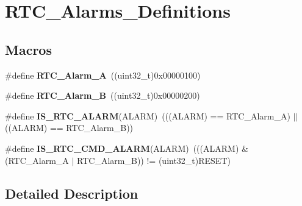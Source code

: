 \hypertarget{group___r_t_c___alarms___definitions}{\section{R\-T\-C\-\_\-\-Alarms\-\_\-\-Definitions}
\label{group___r_t_c___alarms___definitions}
}
\subsection*{Macros}
\begin{DoxyCompactItemize}
\item 
\hypertarget{group___r_t_c___alarms___definitions_ga8d6daed1177365822e9f4e443ec394c7}{\#define {\bfseries R\-T\-C\-\_\-\-Alarm\-\_\-\-A}~((uint32\-\_\-t)0x00000100)}\label{group___r_t_c___alarms___definitions_ga8d6daed1177365822e9f4e443ec394c7}

\item 
\hypertarget{group___r_t_c___alarms___definitions_gaf51f54c28f0052d97a8764741218d372}{\#define {\bfseries R\-T\-C\-\_\-\-Alarm\-\_\-\-B}~((uint32\-\_\-t)0x00000200)}\label{group___r_t_c___alarms___definitions_gaf51f54c28f0052d97a8764741218d372}

\item 
\hypertarget{group___r_t_c___alarms___definitions_gab101ad18b0bcde557eb8caac469d7725}{\#define {\bfseries I\-S\-\_\-\-R\-T\-C\-\_\-\-A\-L\-A\-R\-M}(A\-L\-A\-R\-M)~(((A\-L\-A\-R\-M) == R\-T\-C\-\_\-\-Alarm\-\_\-\-A) $|$$|$ ((A\-L\-A\-R\-M) == R\-T\-C\-\_\-\-Alarm\-\_\-\-B))}\label{group___r_t_c___alarms___definitions_gab101ad18b0bcde557eb8caac469d7725}

\item 
\hypertarget{group___r_t_c___alarms___definitions_gae6b65274a46fc3a9f64eb0c9ed4c13e4}{\#define {\bfseries I\-S\-\_\-\-R\-T\-C\-\_\-\-C\-M\-D\-\_\-\-A\-L\-A\-R\-M}(A\-L\-A\-R\-M)~(((A\-L\-A\-R\-M) \& (R\-T\-C\-\_\-\-Alarm\-\_\-\-A $|$ R\-T\-C\-\_\-\-Alarm\-\_\-\-B)) != (uint32\-\_\-t)R\-E\-S\-E\-T)}\label{group___r_t_c___alarms___definitions_gae6b65274a46fc3a9f64eb0c9ed4c13e4}

\end{DoxyCompactItemize}


\subsection{Detailed Description}
